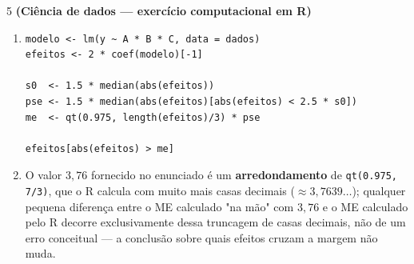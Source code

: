 \documentclass[11pt]{article}
\begin{document}
\begin{questao}{5} \textbf{(Ciência de dados --- exercício computacional em R)}
\end{questao}
\begin{solucao}
\begin{enumerate}[label=(\alph*)]
  \item
  \begin{lstlisting}
modelo <- lm(y ~ A * B * C, data = dados)
efeitos <- 2 * coef(modelo)[-1]

s0  <- 1.5 * median(abs(efeitos))
pse <- 1.5 * median(abs(efeitos)[abs(efeitos) < 2.5 * s0])
me  <- qt(0.975, length(efeitos)/3) * pse

efeitos[abs(efeitos) > me]
  \end{lstlisting}
  \item O valor $3{,}76$ fornecido no enunciado é um \textbf{arredondamento} de
    \texttt{qt(0.975, 7/3)}, que o R calcula com muito mais casas decimais
    ($\approx3{,}7639\ldots$); qualquer pequena diferença entre o ME calculado "na mão" com
    $3{,}76$ e o ME calculado pelo R decorre exclusivamente dessa truncagem de casas decimais, não
    de um erro conceitual --- a conclusão sobre quais efeitos cruzam a margem não muda.
\end{enumerate}
\end{solucao}
\end{document}
